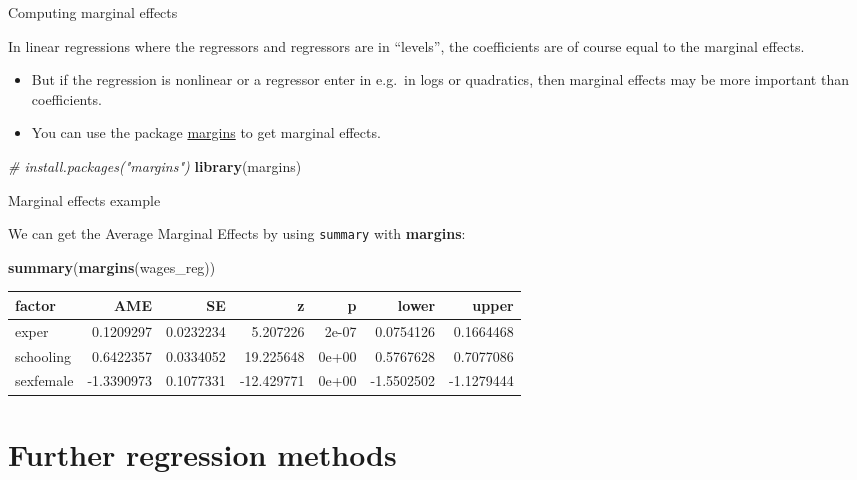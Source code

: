 \documentclass[ignorenonframetext,]{beamer}
\newenvironment{Shaded}{\begin{snugshade}}{\end{snugshade}}
\newcommand{\KeywordTok}[1]{\textcolor[rgb]{0.26,0.66,0.93}{\textbf{#1}}}
\newcommand{\CommentTok}[1]{\textcolor[rgb]{0.00,0.40,1.00}{\textit{#1}}}
\newcommand{\NormalTok}[1]{\textcolor[rgb]{0.74,0.68,0.62}{#1}}
\begin{document}
\begin{frame}[fragile]{Computing marginal effects}

In linear regressions where the regressors and regressors are in
``levels'', the coefficients are of course equal to the marginal
effects.

\begin{itemize}
\item
  But if the regression is nonlinear or a regressor enter in e.g.~in
  logs or quadratics, then marginal effects may be more important than
  coefficients.
\item
  You can use the package
  \href{https://www.rdocumentation.org/packages/margins/versions/0.3.0}{margins}
  to get marginal effects.
\end{itemize}

\begin{Shaded}
\begin{Highlighting}[]
\CommentTok{# install.packages("margins")}
\KeywordTok{library}\NormalTok{(margins)}
\end{Highlighting}
\end{Shaded}

\end{frame}

\begin{frame}[fragile]{Marginal effects example}

We can get the Average Marginal Effects by using \texttt{summary} with
\textbf{margins}:

\begin{Shaded}
\begin{Highlighting}[]
\KeywordTok{summary}\NormalTok{(}\KeywordTok{margins}\NormalTok{(wages_reg))}
\end{Highlighting}
\end{Shaded}

\begin{longtable}[]{@{}lrrrrrr@{}}
\toprule
factor & AME & SE & z & p & lower & upper\tabularnewline
\midrule
\endhead
exper & 0.1209297 & 0.0232234 & 5.207226 & 2e-07 & 0.0754126 &
0.1664468\tabularnewline
schooling & 0.6422357 & 0.0334052 & 19.225648 & 0e+00 & 0.5767628 &
0.7077086\tabularnewline
sexfemale & -1.3390973 & 0.1077331 & -12.429771 & 0e+00 & -1.5502502 &
-1.1279444\tabularnewline
\bottomrule
\end{longtable}

\end{frame}

\section{Further regression methods}\label{further-regression-methods}
\end{document}
